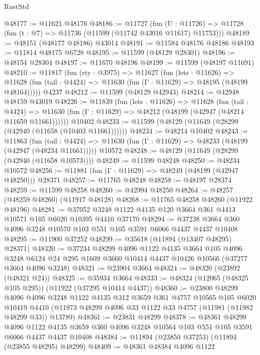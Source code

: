 \begin{lexlean}{RustStd}
\begin{coremodule}
@48177 := @11621 @48176
@48186 := @11727
    (fun (U : @11726) => @11728 (fun (t : @7) => @11736 (@11599 (@11742 @43016 @11617) @11753)))
@48189 := @48151 (@48177 @48186) @43014
@48191 := @11584 @48176 @48186
@48193 := @11814 @48175 @6728
@48195 := @11599 (@48129 @28301)
@48196 := @48154 @28304
@48197 := @11670 @48196
@48199 := @11599 (@48197 @11691)
@48210 := @11817
    (fun (rty : @3975) =>
    @11627
      (fun (lets : @11626) =>
      @11628 (fun (tail : @4424) => @11630 (fun (Γ : @11629) => @48195 (@48199 @48164)))))
    @4237
@48212 := @11599 (@48129 @42943)
@48214 := @42948 @48159 @43019
@48226 := @11839
    (fun (lets : @11626) =>
    @11628
      (fun (tail : @4424) =>
      @11630 (fun (Γ : @11629) => @48212 (@48199 (@42947 (@48214 @11659 @11661))))))
    @10402
@48233 := @11599 (@48129 (@11649 (@28299 (@42940 (@11658 (@10403 @11661))))))
@48234 := @48214 @10402
@48243 := @11863
    (fun (tail : @4424) => @11630 (fun (Γ : @11629) => @48233 (@48199 (@42947 (@48234 @11661)))))
    @10572
@48248 := @48129 (@11649 (@28299 (@42940 (@11658 @10573))))
@48249 := @11599 @48248
@48250 := @48234 @10572
@48256 := @11881 (fun (Γ : @11629) => @48249 (@48199 (@42947 @48250))) @28371
@48257 := @11765 @48248
@48258 := @48197 @28374
@48259 := @11599 @48258
@48260 := @42994 @48250
@48264 := @48257 (@48259 @48260) (@11917 @48128)
@48268 := @11765 @48258 @48260 (@11922 @48196)
@48281 := @37052 @3248 @1122 @4135 @120 @3664 @361 @4413 @10571 @105 @6020 @10395 @4410 @37170
@48294 := @37238 @3664 @360 @4096 @3248 @10570 @103 @551 @105 @3591 @6066 @4437 @4437 @10408
@48295 := @11900 @37252
@48299 := @35618 (@11894 (@13407 @48295) @28371)
@48320 := @37234
    @48299
    @4096
    @1122
    @4135
    @3664
    @105
    @4096
    @3248
    @6124
    @24
    @295
    @1609
    @3660
    @10414
    @4437
    @10426
    @10566
    (@37277 @3664 @4096 @3248)
@48321 := @23904 @3664
@48324 := @48320 (@23892 (@48321 @24))
@48325 := @35934 @3664
@48333 := @48324 (@12065 (@48325 @105 @295)) (@11922 (@37295 @10414 @4437))
@48360 := @23800
    @48299
    @4096
    @4096
    @3248
    @1122
    @4135
    @312
    @3659
    @361
    @4757
    @10565
    @105
    @6020
    @10419
    @4410
    (@11973 @48299 @4096 @33 @1122 @33 @4757 (@11981 (@11982 @48299 @33)) @13789)
@48361 := @23831 @48299
@48378 := @48361
    @48299
    @4096
    @1122
    @4135
    @3659
    @360
    @4096
    @3248
    @10564
    @103
    @551
    @105
    @3591
    @6066
    @4437
    @4437
    @10408
@48384 := @11894 (@23850 @37253) (@11894 (@23855 @48295) @48299)
@48409 := @48361
    @48384
    @4096
    @1122

\end{coremodule}
\end{lexlean}

